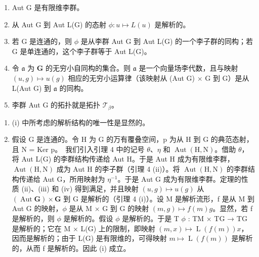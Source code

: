 \begin{enumerate}
\def\labelenumi{(\roman{enumi})}
\setcounter{enumi}{1}
\item
  Aut G 是有限维李群。
\item
  从 Aut G 到 Aut L(G) 的态射 \(\phi: u \mapsto L(u)\) 是解析的。
\item
  若 G 是连通的，则 \(\phi\) 是从李群 Aut G 到 Aut L(G) 的一个李子群的同构；若 G 是单连通的，这个李子群等于 Aut L(G)。
\item
  令 \(\mathfrak{a}\) 为 \(\mathbf{G}\) 的无穷小自同构的集合。则 \(\mathfrak{a}\) 是一个向量场李代数，且与映射 \((u, g) \mapsto u(g)\) 相应的无穷小运算律（该映射从 (Aut G) \(\times\) G 到 G）是从 L(Aut G) 到 \(\mathfrak{a}\) 的同构。
\item
  李群 Aut G 的拓扑就是拓扑 \(\mathcal{T}_{\beta}\)。
\end{enumerate}

\begin{enumerate}
\def\labelenumi{(\alph{enumi})}
\item
  (i) 中所考虑的解析结构的唯一性是显然的。
\item
  假设 G 是连通的。令 H 为 G 的万有覆叠空间，p 为从 H 到 G 的典范态射，且 N = Ker p。~我们引入引理 4 中的记号 \(\theta\)、\(\eta\) 和 \(\operatorname{Aut}(\mathrm{H},\mathrm{N})\)。借助 \(\theta\)，将 Aut L(G) 的李群结构传递给 Aut H。于是 Aut H 成为有限维李群，\(\operatorname{Aut}(\mathrm{H},\mathrm{N})\) 成为 Aut H 的李子群（引理 4 (ii)）。将 \(\operatorname{Aut}(\mathrm{H},\mathrm{N})\) 的李群结构传递给 Aut G，所用映射为 \(\eta^{-1}\)。于是 Aut G 成为有限维李群。定理的性质 (ii)、(iii) 和 (iv) 得到满足，并且映射 \((u,g)\mapsto u(g)\) 从 \((\operatorname{Aut}\mathbf{G})\times\mathbf{G}\) 到 G 是解析的（引理 4 (i)）。设 M 是解析流形，f 是从 M 到 Aut G 的映射，\(\phi\) 是从 M × G 到 G 的映射 \((m,g)\mapsto f(m)g\)。显然，若 f 是解析的，则 \(\phi\) 是解析的。假设 \(\phi\) 是解析的。于是 T \(\phi\) : TM × TG → TG 是解析的；它在 M × L(G) 上的限制，即映射 \((m,x)\mapsto\operatorname{L}(f(m))x\)，因而是解析的；由于 L(G) 是有限维的，可得映射 \(m\mapsto\operatorname{L}(f(m))\) 是解析的，从而 f 是解析的。因此 (i) 成立。
\end{enumerate}

